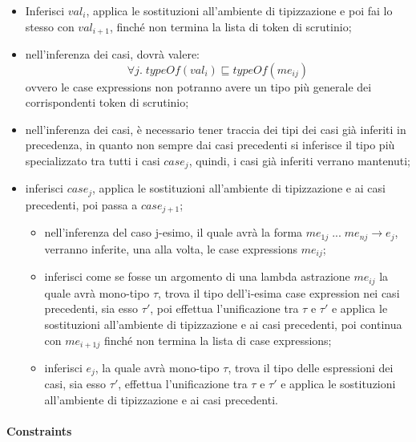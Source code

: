 \documentclass[10pt,a4paper]{article}
\begin{document}
\begin{itemize}
    \item Inferisci $ val_i $, applica le sostituzioni all'ambiente di tipizzazione e poi fai lo stesso con $ val_{i+1} $,
    finché non termina la lista di token di scrutinio;
    \item nell'inferenza dei casi, dovrà valere:
        \[ \forall j. \; typeOf(val_i) \sqsubseteq typeOf(me_{ij}) \]
    ovvero le case expressions non potranno avere un tipo più generale dei corrispondenti token di scrutinio;
    \item nell'inferenza dei casi, è necessario tener traccia dei tipi dei casi già inferiti in precedenza, in
    quanto non sempre dai casi precedenti si inferisce il tipo più specializzato tra tutti i casi $ case_j $, quindi,
    i casi già inferiti verrano mantenuti;
    \item inferisci $ case_j $, applica le sostituzioni all'ambiente di tipizzazione e ai casi precedenti, poi passa
    a $ case_{j+1} $;
    \begin{itemize}
        \item nell'inferenza del caso j-esimo, il quale avrà la forma $ me_{1j} \; ... \; me_{nj} \rightarrow e_j $,
        verranno inferite, una alla volta, le case expressions $ me_{ij} $;
        \item inferisci come se fosse un argomento di una lambda astrazione $ me_{ij} $ la quale avrà mono-tipo $ \tau $,
        trova il tipo dell'i-esima case expression nei casi precedenti, sia esso $ \tau' $, poi effettua
        l'unificazione tra $ \tau $ e $ \tau' $ e applica le sostituzioni
        all'ambiente di tipizzazione e ai casi precedenti, poi continua con $ me_{i+1j} $ finché non termina la lista di
        case expressions;
        \item inferisci $ e_j $, la quale avrà mono-tipo $ \tau $, trova il tipo delle espressioni dei casi, sia esso
        $ \tau' $, effettua l'unificazione tra $ \tau $ e $ \tau' $ e applica le sostituzioni all'ambiente di tipizzazione
        e ai casi precedenti.
    \end{itemize}
\end{itemize}

\paragraph{Constraints}
\end{document}
